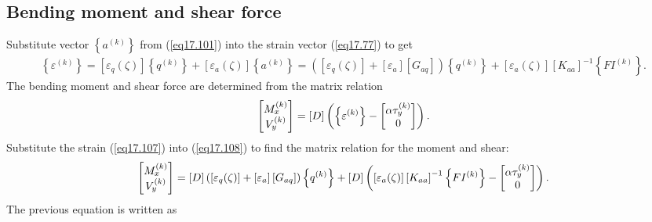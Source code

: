 \documentclass{AeroStructure-ERJohnson}
\begin{document}
\subsection{Bending moment and shear force}\label{sec17.3.4}

Substitute vector $\left\{a^{(k)}\right\}$ from (\ref{eq17.101}) into the strain vector (\ref{eq17.77}) to get
\begin{align}\label{eq17.107}
\left\{\varepsilon^{(k)}\right\}=\left[\varepsilon_{q}(\zeta)\right]\left\{q^{(k)}\right\}+\left[\varepsilon_{a}(\zeta)\right]\left\{a^{(k)}\right\}=\left(\left[\varepsilon_{q}(\zeta)\right]+\left[\varepsilon_{a}\right]\left[G_{a q}\right]\right)\left\{q^{(k)}\right\}+\left[\varepsilon_{a}(\zeta)\right]\left[K_{a a}\right]^{-1}\left\{F I^{(k)}\right\}.
\end{align}
The bending moment and shear force are determined from the matrix relation
\begin{align}\label{eq17.108}
\left[\begin{array}{@{}c@{}}M_{x}^{(k)} \\V_{y}^{(k)}\end{array}\right]=[D]\left(\left\{\varepsilon^{(k)}\right\}-\left[\begin{array}{@{}c@{}}\alpha \tau_{y}^{(k)} \\0\end{array}\right]\right).
\end{align}
Substitute the strain (\ref{eq17.107}) into (\ref{eq17.108}) to find the matrix relation for the moment and shear:
\begin{align}\label{eq17.109}
\left[\begin{array}{@{}c@{}}M_{x}^{(k)} \\V_{y}^{(k)}\end{array}\right]=[D]\left(\left[\varepsilon_{q}(\zeta)\right]+\left[\varepsilon_{a}\right]\left[G_{a q}\right]\right)\left\{q^{(k)}\right\}+[D]\left(\left[\varepsilon_{a}(\zeta)\right]\left[K_{a a}\right]^{-1}\left\{F I^{(k)}\right\}-\left[\begin{array}{@{}c@{}}\alpha \tau_{y}^{(k)} \\0\end{array}\right]\right).
\end{align}
The previous equation is written as
\end{document}

